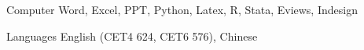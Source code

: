 


\begin{cvskills}


\cvskill
{Computer} %
{Word, Excel, PPT, Python, Latex, R, Stata, Eviews, Indesign} %



\cvskill
{Languages} %
{English (CET4 624, CET6 576), Chinese} %


\end{cvskills}